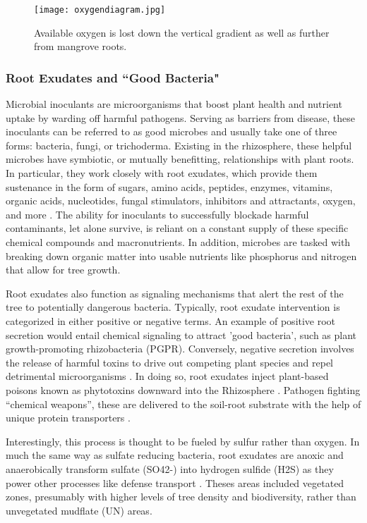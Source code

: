   
  \begin{figure}[!htb]
      \centering
        \texttt{[image: oxygendiagram.jpg]}
        \caption {Available oxygen is lost down the vertical gradient as well as further from mangrove roots.}
        \label{fig:oxygendiagram}
\end{figure}
  


\subsubsection{Root Exudates and ``Good Bacteria"}

  Microbial inoculants are microorganisms that boost plant health and nutrient uptake by warding off harmful pathogens. Serving as barriers from disease, these inoculants can be referred to as good microbes and usually take one of three forms: bacteria, fungi, or trichoderma. Existing in the rhizosphere, these helpful microbes have symbiotic, or mutually benefitting, relationships with plant roots. In particular, they work closely with root exudates, which provide them sustenance in the form of sugars, amino acids, peptides, enzymes, vitamins, organic acids, nucleotides, fungal stimulators, inhibitors and attractants, oxygen, and more \citep{shukla2011nature}. The ability for inoculants to successfully blockade harmful contaminants, let alone survive, is reliant on a constant supply of these specific chemical compounds and macronutrients. In addition, microbes are tasked with breaking down organic matter into usable nutrients like phosphorus and nitrogen that allow for tree growth. 
	
	
Root exudates also function as signaling mechanisms that alert the rest of the tree to potentially dangerous bacteria. Typically, root exudate intervention is categorized in either positive or negative terms. An example of positive root secretion would entail chemical signaling to attract 'good bacteria', such as plant growth-promoting rhizobacteria (PGPR). Conversely, negative secretion involves the release of harmful toxins to drive out competing plant species and repel detrimental microorganisms \citep{shukla2011nature}. In doing so, root exudates inject plant-based poisons known as phytotoxins downward into the Rhizosphere \citep{shukla2011nature}. Pathogen fighting ``chemical weapons'', these are delivered to the soil-root substrate with the help of unique protein transporters \citep{baetz2014root}.

Interestingly, this process is thought to be fueled by sulfur rather than oxygen. In much the same way as sulfate reducing bacteria, root exudates are anoxic and anaerobically transform sulfate (SO42-) into hydrogen sulfide (H2S) as they power other processes like defense transport \citep{van2002rocks}. Theses areas included vegetated zones, presumably with higher levels of tree density and biodiversity, rather than unvegetated mudflate (UN) areas.

